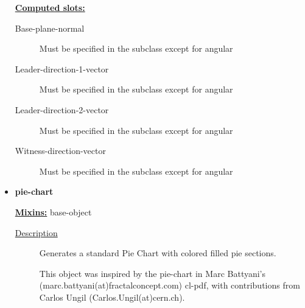 \documentclass [11pt]{book}
\begin{document}
\begin{itemize}
\textbf{
\underline{Computed slots:}}

\begin{description}

\item [Base-plane-normal]

Must be specified in the subclass except for angular




\item [Leader-direction-1-vector]

Must be specified in the subclass except for angular




\item [Leader-direction-2-vector]

Must be specified in the subclass except for angular




\item [Witness-direction-vector]

Must be specified in the subclass except for angular




\end{description}







\item {}
\label{prim:pie-chart}
\textbf{pie-chart}


\textbf{
\underline{Mixins:}} base-object





\begin{description}

\item [
\underline{Description}]


Generates a standard Pie Chart with colored filled pie sections.

This object was inspired by the pie-chart in Marc Battyani's (marc.battyani(at)fractalconcept.com)
cl-pdf, with contributions from Carlos Ungil (Carlos.Ungil(at)cern.ch).



\end{description}





\end{itemize}
\end{document}
